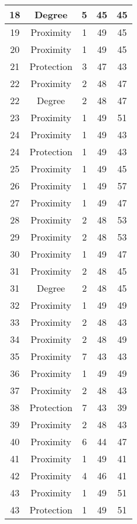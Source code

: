 \documentclass[results.tex]{subfiles}
\begin{document}
\begin{center}
\begin{tabular}{| c || c | c | c | c |}
    \hline
    18 & Degree & 5 & 45 & 45 \\ 
    \hline
    19 & Proximity & 1 & 49 & 45 \\ 
    \hline
    20 & Proximity & 1 & 49 & 45 \\ 
    \hline
    21 & Protection & 3 & 47 & 43 \\ 
    \hline
    22 & Proximity & 2 & 48 & 47 \\ 
    \hline
    22 & Degree & 2 & 48 & 47 \\ 
    \hline
    23 & Proximity & 1 & 49 & 51 \\ 
    \hline
    24 & Proximity & 1 & 49 & 43 \\ 
    \hline
    24 & Protection & 1 & 49 & 43 \\ 
    \hline
    25 & Proximity & 1 & 49 & 45 \\ 
    \hline
    26 & Proximity & 1 & 49 & 57 \\ 
    \hline
    27 & Proximity & 1 & 49 & 47 \\ 
    \hline
    28 & Proximity & 2 & 48 & 53 \\ 
    \hline
    29 & Proximity & 2 & 48 & 53 \\ 
    \hline
    30 & Proximity & 1 & 49 & 47 \\ 
    \hline
    31 & Proximity & 2 & 48 & 45 \\ 
    \hline
    31 & Degree & 2 & 48 & 45 \\ 
    \hline
    32 & Proximity & 1 & 49 & 49 \\ 
    \hline
    33 & Proximity & 2 & 48 & 43 \\ 
    \hline
    34 & Proximity & 2 & 48 & 49 \\ 
    \hline
    35 & Proximity & 7 & 43 & 43 \\ 
    \hline
    36 & Proximity & 1 & 49 & 49 \\ 
    \hline
    37 & Proximity & 2 & 48 & 43 \\ 
    \hline
    38 & Protection & 7 & 43 & 39 \\ 
    \hline
    39 & Proximity & 2 & 48 & 43 \\ 
    \hline
    40 & Proximity & 6 & 44 & 47 \\ 
    \hline
    41 & Proximity & 1 & 49 & 41 \\ 
    \hline
    42 & Proximity & 4 & 46 & 41 \\ 
    \hline
    43 & Proximity & 1 & 49 & 51 \\ 
    \hline
    43 & Protection & 1 & 49 & 51 \\ 

\end{tabular}
\end{center}
\end{document}
